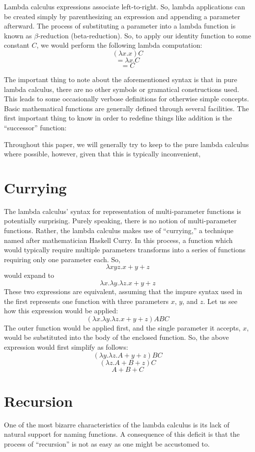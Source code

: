 \documentclass[twocolumn,titlepage,12pt]{article}
\begin{document}
Lambda calculus expressions associate left-to-right. So, lambda applications can be created simply by parenthesizing an expression and appending a parameter afterward. The process of substituting a parameter into a lambda function is known as $\beta$-reduction (beta-reduction). So, to apply our identity function to some constant $C$, we would perform the following lambda computation:
$$(\lambda x.x)C$$
$$=\lambda x.C$$
$$=C$$

The important thing to note about the aforementioned syntax is that in pure lambda calculus, there are no other symbols or gramatical constructions used. This leads to some occasionally verbose definitions for otherwise simple concepts. Basic mathematical functions are generally defined through several facilities. The first important thing to know in order to redefine things like addition is the ``successor'' function:
$$$$


Throughout this paper, we will generally try to keep to the pure lambda calculus where possible, however, given that this is typically inconvenient,

\section{Currying}
The lambda calculus' syntax for representation of multi-parameter functions is potentially surprising. Purely speaking, there is no notion of multi-parameter functions. Rather, the lambda calculus makes use of ``currying,'' a technique named after mathematician Haskell Curry. In this process, a function which would typically require multiple parameters transforms into a series of functions requiring only one parameter each. So,
$$\lambda xyz.x+y+z$$
would expand to
$$\lambda x.\lambda y.\lambda z.x+y+z$$
These two expressions are equivalent, assuming that the impure syntax used in the first represents one function with three parameters $x$, $y$, and $z$. Let us see how this expression would be applied:
$$(\lambda x.\lambda y.\lambda z.x+y+z)ABC$$
The outer function would be applied first, and the single parameter it accepts, $x$, would be substituted into the body of the enclosed function. So, the above expression would first simplify as follows:
$$(\lambda y.\lambda z.A+y+z)BC$$
$$(\lambda z.A+B+z)C$$
$$A+B+C$$

\section{Recursion}
One of the most bizarre characteristics of the lambda calculus is its lack of natural support for naming functions. A consequence of this deficit is that the process of ``recursion'' is not as easy as one might be accustomed to.
\end{document}
